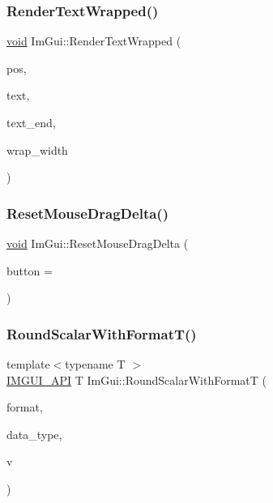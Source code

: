 \mbox{\label{namespaceImGui_aa483b40f6899e1b289b4bf6c2673d1d2}} 
\subsubsection{\texorpdfstring{Render\+Text\+Wrapped()}{RenderTextWrapped()}}
{\footnotesize\ttfamily \hyperlink{imgui__impl__opengl3__loader_8h_ac668e7cffd9e2e9cfee428b9b2f34fa7}{void} Im\+Gui\+::\+Render\+Text\+Wrapped (\begin{DoxyParamCaption}\item[{\hyperlink{structImVec2}{Im\+Vec2}}]{pos,  }\item[{const char $\ast$}]{text,  }\item[{const char $\ast$}]{text\+\_\+end,  }\item[{float}]{wrap\+\_\+width }\end{DoxyParamCaption})}

\mbox{\label{namespaceImGui_a771c37d1bb71fb7f30632721618633b9}} 
\subsubsection{\texorpdfstring{Reset\+Mouse\+Drag\+Delta()}{ResetMouseDragDelta()}}
{\footnotesize\ttfamily \hyperlink{imgui__impl__opengl3__loader_8h_ac668e7cffd9e2e9cfee428b9b2f34fa7}{void} Im\+Gui\+::\+Reset\+Mouse\+Drag\+Delta (\begin{DoxyParamCaption}\item[{Im\+Gui\+Mouse\+Button}]{button = {} }\end{DoxyParamCaption})}

\mbox{\label{namespaceImGui_ace887ae2de27d34ee7300a0bf63768a7}} 
\subsubsection{\texorpdfstring{Round\+Scalar\+With\+Format\+T()}{RoundScalarWithFormatT()}}
{\footnotesize\ttfamily template$<$typename T $>$ \\
\hyperlink{imgui_8h_a43829975e84e45d1149597467a14bbf5}{I\+M\+G\+U\+I\+\_\+\+A\+PI} T Im\+Gui\+::\+Round\+Scalar\+With\+FormatT (\begin{DoxyParamCaption}\item[{const char $\ast$}]{format,  }\item[{Im\+Gui\+Data\+Type}]{data\+\_\+type,  }\item[{T}]{v }\end{DoxyParamCaption})}

